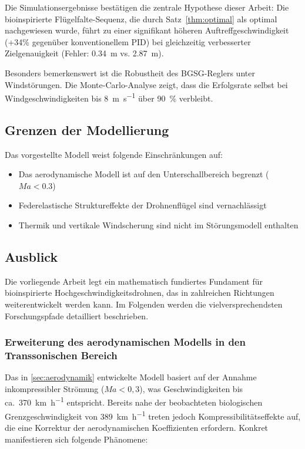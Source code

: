 ﻿\documentclass[12pt,a4paper]{article}
\theoremstyle{remark}
\begin{document}
	Die Simulationsergebnisse bestätigen die zentrale Hypothese dieser Arbeit: Die bioinspirierte Flügelfalte-Sequenz, die durch Satz~\ref{thm:optimal} als optimal nachgewiesen wurde, führt zu einer signifikant höheren Auftreffgeschwindigkeit (+34\% gegenüber konventionellem PID) bei gleichzeitig verbesserter Zielgenauigkeit (Fehler: 0.34~m vs. 2.87~m).
	
	Besonders bemerkenswert ist die Robustheit des BGSG-Reglers unter Windstörungen. Die Monte-Carlo-Analyse zeigt, dass die Erfolgsrate selbst bei Windgeschwindigkeiten bis \SI{8}{\m\per\second} über \SI{90}{\percent} verbleibt.
	
	\subsection{Grenzen der Modellierung}
	
	Das vorgestellte Modell weist folgende Einschränkungen auf:
	\begin{itemize}
		\item Das aerodynamische Modell ist auf den Unterschallbereich begrenzt ($Ma < 0.3$)
		\item Federelastische Struktureffekte der Drohnenflügel sind vernachlässigt
		\item Thermik und vertikale Windscherung sind nicht im Störungsmodell enthalten
	\end{itemize}
	
	\subsection{Ausblick}
	\label{sec:ausblick}

	Die vorliegende Arbeit legt ein mathematisch fundiertes Fundament für bioinspirierte Hochgeschwindigkeitsdrohnen, das in zahlreichen Richtungen weiterentwickelt werden kann. Im Folgenden werden die vielversprechendsten Forschungspfade detailliert beschrieben.

	\subsubsection{Erweiterung des aerodynamischen Modells in den Transsonischen Bereich}

	Das in \cref{sec:aerodynamik} entwickelte Modell basiert auf der Annahme inkompressibler Strömung ($Ma < 0{,}3$), was Geschwindigkeiten bis ca.\ \SI{370}{\km\per\hour} entspricht. Bereits nahe der beobachteten biologischen Grenzgeschwindigkeit von \SI{389}{\km\per\hour} treten jedoch Kompressibilitätseffekte auf, die eine Korrektur der aerodynamischen Koeffizienten erfordern. Konkret manifestieren sich folgende Phänomene:
\end{document}
